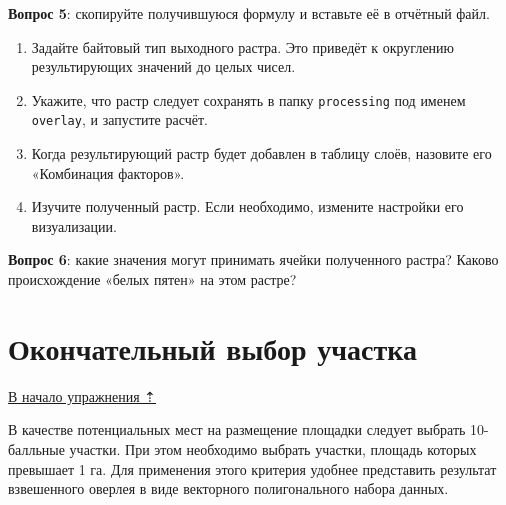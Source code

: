 \documentclass[
  12pt,
]{book}
\begin{document}
\textbf{Вопрос 5}: скопируйте получившуюся формулу и вставьте её в отчётный файл.

\begin{enumerate}
\def\labelenumi{\arabic{enumi}.}
\setcounter{enumi}{3}
\item
  Задайте байтовый тип выходного растра. Это приведёт к округлению результирующих значений до целых чисел.
\item
  Укажите, что растр следует сохранять в папку \texttt{processing} под именем \texttt{overlay}, и запустите расчёт.
\item
  Когда результирующий растр будет добавлен в таблицу слоёв, назовите его «Комбинация факторов».
\item
  Изучите полученный растр. Если необходимо, измените настройки его визуализации.
\end{enumerate}

\textbf{Вопрос 6}: какие значения могут принимать ячейки полученного растра? Каково происхождение «белых пятен» на этом растре?

\hypertarget{weighted-overlay-final-decision}{%
\section{Окончательный выбор участка}\label{weighted-overlay-final-decision}}

\protect\hyperlink{weighted-overlay}{В начало упражнения ⇡}

В качестве потенциальных мест на размещение площадки следует выбрать 10-балльные участки. При этом необходимо выбрать участки, площадь которых превышает 1 га. Для применения этого критерия удобнее представить результат взвешенного оверлея в виде векторного полигонального набора данных.
\end{document}
